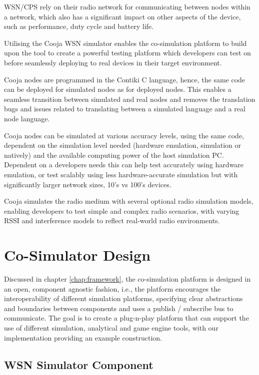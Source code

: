 WSN/CPS rely on their radio network for communicating between nodes within a network, which also has a significant impact on other aspects of the device, such as performance, duty cycle and battery life.


Utilising the Cooja WSN simulator enables the co-simulation platform to build upon the tool to create a powerful testing platform which developers can test on before seamlessly deploying to real devices in their target environment.

Cooja nodes are programmed in the Contiki C language, hence, the same code can be deployed for simulated nodes as for deployed nodes. This enables a seamless transition between simulated and real nodes and removes the translation bugs and issues related to translating between a simulated language and a real node language.

Cooja nodes can be simulated at various accuracy levels, using the same code, dependent on the simulation level needed (hardware emulation, simulation or natively) and the available computing power of the host simulation PC. Dependent on a developers needs this can help test accurately using hardware emulation, or test scalably using less hardware-accurate simulation but with significantly larger network sizes, 10's vs 100's devices.

Cooja simulates the radio medium with several optional radio simulation models, enabling developers to test simple and complex radio scenarios, with varying RSSI and interference models to reflect real-world radio environments.


\section{Co-Simulator Design}
\label{sec:Design}
Discussed in chapter \ref{chap:framework}, the co-simulation platform is designed in an open, component agnostic fashion, i.e., the platform encourages the interoperability of different simulation platforms, specifying clear abstractions and boundaries between components and uses a publish / subscribe bus to communicate. The goal is to create a plug-n-play platform that can support the use of different simulation, analytical and game engine tools, with our implementation providing an example construction.

\subsection{WSN Simulator Component} %
\label{sub:wsn_simulator_component}

